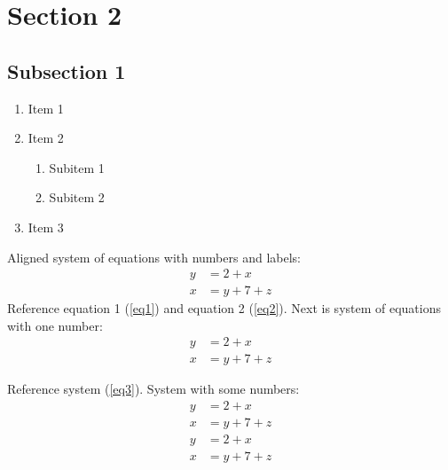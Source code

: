 \documentclass[a4paper,12pt]{article}
\begin{document}
    \section{Section 2}
    \subsection{Subsection 1}
    \blindtext
    \begin{enumerate}
    	\item Item 1
    	\item Item 2
    	\begin{enumerate}
    		\item Subitem 1
    		\item Subitem 2
    	\end{enumerate}
    	\item Item 3
    \end{enumerate}
    Aligned system of equations with numbers and labels:
	\begin{align}
		y &= 2 + x \label{eq1} \\
		x &= y + 7 + z \label{eq2}
	\end{align}
	Reference equation 1 (\ref{eq1}) and equation 2 (\ref{eq2}). Next is system of equations with one number:
	\begin{equation}
	\begin{aligned}
		y &= 2 + x  \\
		x &= y + 7 + z
	\end{aligned}
	\label{eq3}
	\end{equation}
	
	Reference system (\ref{eq3}). System with some numbers:
	\begin{align}
		y &= 2 + x  \nonumber \\
		x &= y + 7 + z \\
		y &= 2 + x  \\
		x &= y + 7 + z \nonumber
	\end{align}
	
	\clearpage\thispagestyle{empty}\addtocounter{page}{-1}\mbox{}
	
	
	
	
\end{document}
